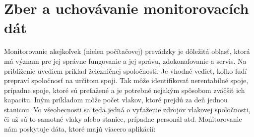 \documentclass[11pt,final,oneside]{fithesis}
\begin{document}
\chapter{Zber a uchovávanie monitorovacích dát}
Monitorovanie akejkoľvek (nielen počítačovej) prevádzky je dôležitá oblasť, ktorá má význam pre jej správne fungovanie a jej správu, zdokonaľovanie a servis. Na priblíženie uvediem príklad železničnej spoločnosti. 
Je vhodné vedieť, koľko ľudí prepraví spoločnosť na určitom spoji. Tak môže identifikovať nerentabilné spoje, prípadne spoje, ktoré sú preťažené
a je potrebné nejakým spôsobom zväčšiť ich kapacitu. Iným príkladom môže počet vlakov, ktoré prejdú za deň jednou stanicou. Vo všeobecnosti sa teda jedná o vyťaženie zdrojov vlakovej spoločnosti, či už sú to samotné
vlaky alebo stanice, prípadne personál atď. Monitorovanie nám poskytuje dáta, ktoré majú viacero aplikácií:
\end{document}
